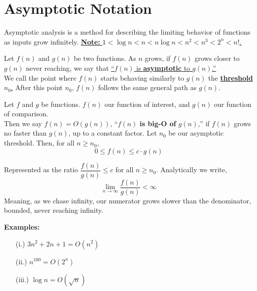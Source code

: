 

\section{Asymptotic Notation}

Asymptotic analysis is a method for describing the limiting behavior of functions as inputs grow infinitely.
\underline{\textbf{Note:} $1 < \log n < n < n \log n < n^2 < n^3 < 2^n < n!$.}

\begin{Def}[Asymptotic]
    
    Let \(f(n)\) and \(g(n)\) be two functions. As \(n\) grows, if \(f(n)\) grows closer to \(g(n)\) never reaching, we say that \underline{``$f(n)$ is \textbf{asymptotic} to \(g(n)\).''}\\
    
    \noindent
    We call the point where \(f(n)\) starts behaving similarly to \(g(n)\) the \underline{\textbf{threshold} \(n_0\).} After this point $n_0$, \(f(n)\) follows the same general path as \(g(n)\).
\end{Def}

\begin{Def}

    \label{def:bigO}

    Let $f$ and $g$ be functions. $f(n)$ our function of interest, and $g(n)$
    our function of comparison.\\

    \noindent
    Then we say $f(n)=O(g(n))$, ``$f(n)$ \textbf{is big-O of} $g(n)$,'' if $f(n)$ 
    grows no faster than $g(n)$, up to a constant factor.
    Let $n_0$ be our asymptotic threshold. Then, for all $n\geq n_0$,
    \large
    \[0\leq f(n) \leq c\cdot g(n)\]
    \normalsize
    
    \noindent
    Represented as the ratio $\dfrac{f(n)}{g(n)}\leq c$ for all $n\geq n_0$. Analytically we write,
    \Large
    \[\lim_{n\to\infty}\dfrac{f(n)}{g(n)}< \infty\]
    \normalsize
    \noindent
    Meaning, as we chase infinity, our numerator grows slower than the denominator, bounded, never reaching infinity. 
\end{Def}

\newpage

\noindent
\textbf{Examples:}
\begin{enumerate}
    \item[(i.)] $3n^2+2n+1=O(n^2)$
    \item[(ii.)] $n^{100}=O(2^n)$
    \item[(iii.)] $\log n=O(\sqrt{n})$ 
\end{enumerate}

